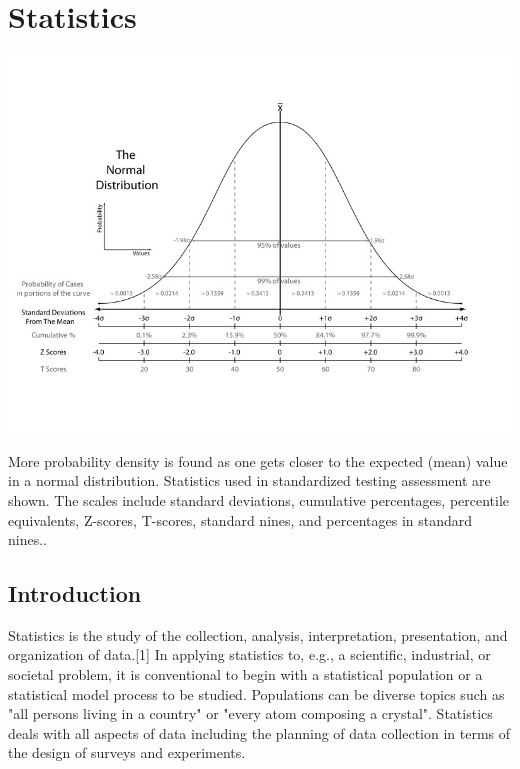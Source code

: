\chapter{Statistics}

\begin{marginfigure}%
  \includegraphics[width=\linewidth]{The_Normal_Distribution}
  \caption{More probability density is found as one gets closer to the expected (mean) value in a normal distribution. Statistics used in standardized testing assessment are shown. The scales include standard deviations, cumulative percentages, percentile equivalents, Z-scores, T-scores, standard nines, and percentages in standard nines..}
  \label{fig:marginfig}
\end{marginfigure}


\normalsize

\section{Introduction}
Statistics is the study of the collection, analysis, interpretation, presentation, and organization of data.[1] In applying statistics to, e.g., a scientific, industrial, or societal problem, it is conventional to begin with a statistical population or a statistical model process to be studied. Populations can be diverse topics such as "all persons living in a country" or "every atom composing a crystal". Statistics deals with all aspects of data including the planning of data collection in terms of the design of surveys and experiments.


\vspace{1cm}
